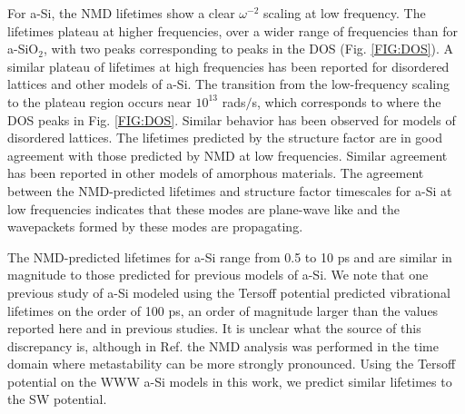 \documentclass[aps,prb,onecolumn,preprint,superscriptaddress,footinbib,amsmath,amssymb,floatfix]{revtex4}
\begin{document}
For a-Si, the NMD lifetimes show a clear $\omega^{-2}$ 
scaling at low frequency. 
The lifetimes plateau at higher frequencies,
over a wider range of frequencies than for a-SiO$_2$, with two peaks 
corresponding to peaks in the DOS (Fig. \ref{FIG:DOS}). A similar 
plateau of lifetimes at high frequencies has been 
reported for disordered lattices
\cite{sheng_heat_1991,he_lattice_2012,larkin_predicting_2013} and 
other models of a-Si.\cite{he_heat_2011} 
The transition from the low-frequency scaling to 
the plateau region occurs near 
$10^{13}$ rads$/$s, which corresponds to where the DOS peaks in Fig. 
\ref{FIG:DOS}. 
Similar behavior has been observed for models of disordered lattices.
\cite{larkin_predicting_2013} The lifetimes predicted by the 
structure factor are in good agreement with those predicted by NMD 
at low frequencies. Similar agreement has been reported in other 
models of amorphous materials.
\cite{mazzacurati_low-frequency_1996,bickham_calculation_1998,
bickham_numerical_1999,feldman_numerical_1999} 
The agreement between the 
NMD-predicted lifetimes and structure factor timescales for a-Si at 
low frequencies indicates that these modes are plane-wave like 
and the wavepackets formed by these modes are propagating.
\cite{feldman_thermal_1993,feldman_numerical_1999,allen_diffusons_1999}

The NMD-predicted lifetimes for a-Si range from 0.5 to 10 ps 
and are similar in magnitude to 
those predicted for previous models of a-Si.
\cite{fabian_anharmonic_1996,bickham_calculation_1998,
bickham_numerical_1999,fabian_numerical_2003}  
We note that one previous study of a-Si modeled using the 
Tersoff potential predicted vibrational lifetimes on 
the order of 100 ps, an order of magnitude larger than the values 
reported here and in previous studies.
\cite{fabian_anharmonic_1996,bickham_calculation_1998,
bickham_numerical_1999,fabian_numerical_2003} 
It is unclear what the source of this 
discrepancy is, although in Ref.  
the NMD analysis was performed in the time domain where metastability 
can be more strongly pronounced. Using the Tersoff potential on the 
WWW a-Si models in this work, we predict similar lifetimes to the 
SW potential. 
\end{document}
